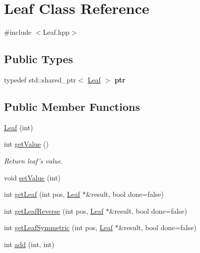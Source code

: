 \hypertarget{class_leaf}{\section{Leaf Class Reference}
\label{class_leaf}
}


{\ttfamily \#include $<$Leaf.\-hpp$>$}

\subsection*{Public Types}
\begin{DoxyCompactItemize}
\item 
\hypertarget{class_leaf_aab9ce9a7da255ca00edf0fb7ac278aa5}{typedef std\-::shared\-\_\-ptr$<$ \hyperlink{class_leaf}{Leaf} $>$ {\bfseries ptr}}\label{class_leaf_aab9ce9a7da255ca00edf0fb7ac278aa5}

\end{DoxyCompactItemize}
\subsection*{Public Member Functions}
\begin{DoxyCompactItemize}
\item 
\hyperlink{class_leaf_a38c8e714bc2fc5b63b8ec80bce9cae32}{Leaf} (int)
\item 
\hypertarget{class_leaf_a522dbb4d9aa1b99f0a7fa1754d78b345}{int \hyperlink{class_leaf_a522dbb4d9aa1b99f0a7fa1754d78b345}{get\-Value} ()}\label{class_leaf_a522dbb4d9aa1b99f0a7fa1754d78b345}

\begin{DoxyCompactList}\small\item\em Return leaf's value. \end{DoxyCompactList}\item 
void \hyperlink{class_leaf_a9e8de3c69c119b4434d794e2514b84d3}{set\-Value} (int)
\item 
int \hyperlink{class_leaf_aefc905332d64dab4c353390f883843e2}{get\-Leaf} (int pos, \hyperlink{class_leaf}{Leaf} $\ast$\&result, bool done=false)
\item 
int \hyperlink{class_leaf_a150228fb4d7f2056e80cbf22f26201f5}{get\-Leaf\-Reverse} (int pos, \hyperlink{class_leaf}{Leaf} $\ast$\&result, bool done=false)
\item 
int \hyperlink{class_leaf_a7e83325c778aad278e16b7f3d51a9d92}{get\-Leaf\-Symmetric} (int pos, \hyperlink{class_leaf}{Leaf} $\ast$\&result, bool done=false)
\item 
int \hyperlink{class_leaf_a0d7a079fcafa6f45fa269f73c8b3162e}{add} (int, int)
\end{DoxyCompactItemize}


